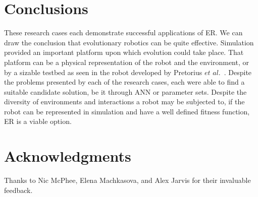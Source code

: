 \documentclass{sig-alternate}
\begin{document}
\section{Conclusions}\label{conclusion}

 These research cases each demonstrate successful applications of ER. We can draw the conclusion that evolutionary robotics can be quite effective. Simulation provided an important platform upon which evolution could take place. That platform can be a physical representation of the robot and the environment, or by a sizable testbed as seen in the robot developed by Pretorius $et$ $al.$~\cite{Pretorius:2009:TAN:1632149.1632171}. Despite the problems presented by each of the research cases, each were able to find a suitable candidate solution, be it through ANN or parameter sets. Despite the diversity of environments and interactions a robot may be subjected to, if the robot can be represented in simulation and have a well defined fitness function, ER is a viable option.



\section{Acknowledgments}
Thanks to Nic McPhee, Elena Machkasova, and Alex Jarvis for their invaluable feedback.

%

%
%
\end{document}
